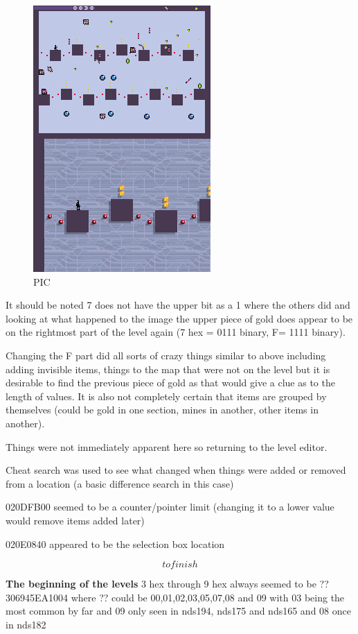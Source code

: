 \documentclass[
]{book}
\begin{document}
\begin{figure}
\centering
\includegraphics{images/185_home_fast6191_romhackingguide_unrenamed_fil___rs_romhackingguideleveleditingworkedNplus18.png}
\caption{PIC}
\end{figure}

It should be noted 7 does not have the upper bit as a 1 where the others did and looking at what happened to the image the upper piece of gold does appear to be on the rightmost part of the level again (7 hex = 0111 binary, F= 1111 binary).

Changing the F part did all sorts of crazy things similar to above including adding invisible items, things to the map that were not on the level but it is desirable to find the previous piece of gold as that would give a clue as to the length of values. It is also not completely certain that items are grouped by themselves (could be gold in one section, mines in another, other items in another).

Things were not immediately apparent here so returning to the level editor.

Cheat search was used to see what changed when things were added or removed from a location (a basic difference search in this case)

020DFB00 seemed to be a counter/pointer limit (changing it to a lower value would remove items added later)

020E0840 appeared to be the selection box location

\[to finish\]

\textbf{The beginning of the levels} 3 hex through 9 hex always seemed to be ??306945EA1004 where ?? could be 00,01,02,03,05,07,08 and 09 with 03 being the most common by far and 09 only seen in nds194, nds175 and nds165 and 08 once in nds182
\end{document}

